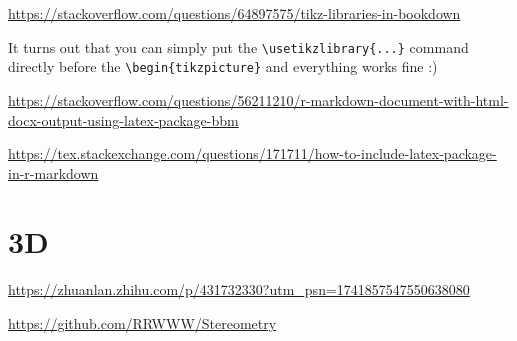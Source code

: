 \documentclass[
]{book}
\theoremstyle{definition}
\theoremstyle{definition}
\theoremstyle{definition}
\theoremstyle{definition}
\theoremstyle{remark}
\begin{document}
\url{https://stackoverflow.com/questions/64897575/tikz-libraries-in-bookdown}

It turns out that you can simply put the \texttt{\textbackslash{}usetikzlibrary\{...\}} command directly before the \texttt{\textbackslash{}begin\{tikzpicture\}} and everything works fine :)

\url{https://stackoverflow.com/questions/56211210/r-markdown-document-with-html-docx-output-using-latex-package-bbm}

\url{https://tex.stackexchange.com/questions/171711/how-to-include-latex-package-in-r-markdown}

\section{3D}\label{d-1}

\url{https://zhuanlan.zhihu.com/p/431732330?utm_psn=1741857547550638080}

\url{https://github.com/RRWWW/Stereometry}
\end{document}
